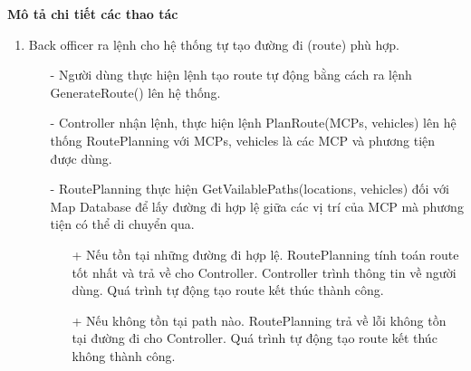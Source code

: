     \textbf{Mô tả chi tiết các thao tác}
    \begin{enumerate}
        \item Back officer ra lệnh cho hệ thống tự tạo đường đi (route) phù hợp.
        \begin{itemize}
            \item[-] Người dùng thực hiện lệnh tạo route tự động bằng cách ra lệnh GenerateRoute() lên hệ thống.
            \item[-] Controller nhận lệnh, thực hiện lệnh PlanRoute(MCPs, vehicles) lên hệ thống RoutePlanning với MCPs, vehicles là các MCP và phương tiện được dùng.
            \item[-] RoutePlanning thực hiện GetVailablePaths(locations, vehicles) đối với Map Database để lấy đường đi hợp lệ giữa các vị trí của MCP mà phương tiện có thể di chuyển qua.
            \begin{itemize}
                \item[+] Nếu tồn tại những đường đi hợp lệ. RoutePlanning tính toán route tốt nhất và trả về cho Controller. Controller trình thông tin về người dùng. Quá trình tự động tạo route kết thúc thành công.
                \item[+] Nếu không tồn tại path nào. RoutePlanning trả về lỗi không tồn tại đường đi cho Controller. Quá trình tự động tạo route kết thúc không thành công.
            \end{itemize}
        \end{itemize}
        

\end{enumerate}
